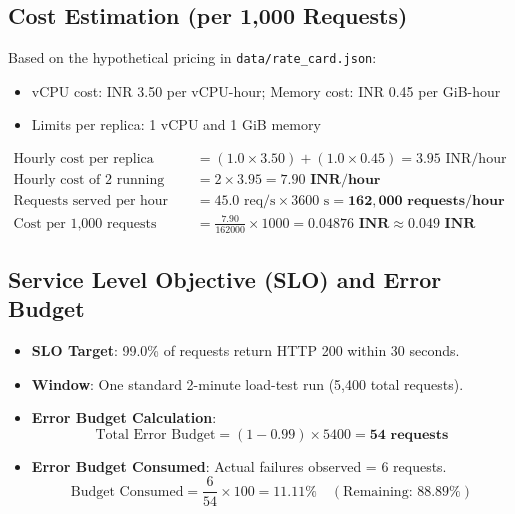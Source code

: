\documentclass[10pt,a4paper]{article}
\begin{document}
\subsection{Cost Estimation (per 1,000 Requests)}
Based on the hypothetical pricing in \texttt{data/rate\_card.json}:
\begin{itemize}\setlength\itemsep{0em}
    \item vCPU cost: INR 3.50 per vCPU-hour; Memory cost: INR 0.45 per GiB-hour
    \item Limits per replica: 1 vCPU and 1 GiB memory
\end{itemize}
\begin{align}
    \text{Hourly cost per replica} &= (1.0 \times 3.50) + (1.0 \times 0.45) = 3.95 \text{ INR/hour} \\
    \text{Hourly cost of 2 running replicas} &= 2 \times 3.95 = \mathbf{7.90 \text{ INR/hour}} \\
    \text{Requests served per hour} &= 45.0 \text{ req/s} \times 3600 \text{ s} = \mathbf{162,000 \text{ requests/hour}} \\
    \text{Cost per 1,000 requests} &= \frac{7.90}{162000} \times 1000 = \mathbf{0.04876 \text{ INR}} \approx \mathbf{0.049 \text{ INR}}
\end{align}

\subsection{Service Level Objective (SLO) and Error Budget}
\begin{itemize}\setlength\itemsep{0em}
    \item \textbf{SLO Target}: 99.0\% of requests return HTTP 200 within 30 seconds.
    \item \textbf{Window}: One standard 2-minute load-test run (5,400 total requests).
    \item \textbf{Error Budget Calculation}:
    \begin{equation}
        \text{Total Error Budget} = (1 - 0.99) \times 5400 = \mathbf{54 \text{ requests}}
    \end{equation}
    \item \textbf{Error Budget Consumed}: Actual failures observed = 6 requests.
    \begin{equation}
        \text{Budget Consumed} = \frac{6}{54} \times 100 = \mathbf{11.11\%} \quad (\text{Remaining: } 88.89\%)
    \end{equation}
\end{itemize}
\end{document}
